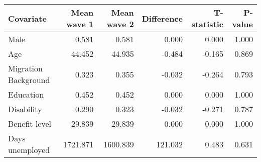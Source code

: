 
\begin{tabular}{lrrrrr}
\toprule
Covariate & Mean wave 1 & Mean wave 2 & Difference & T-statistic & P-value\\
\midrule
Male & 0.581 & 0.581 & 0.000 & 0.000 & 1.000\\
Age & 44.452 & 44.935 & -0.484 & -0.165 & 0.869\\
Migration Background & 0.323 & 0.355 & -0.032 & -0.264 & 0.793\\
Education & 0.452 & 0.452 & 0.000 & 0.000 & 1.000\\
Disability & 0.290 & 0.323 & -0.032 & -0.271 & 0.787\\
Benefit level & 29.839 & 29.839 & 0.000 & 0.000 & 1.000\\
Days unemployed & 1721.871 & 1600.839 & 121.032 & 0.483 & 0.631\\
\bottomrule
\end{tabular}
